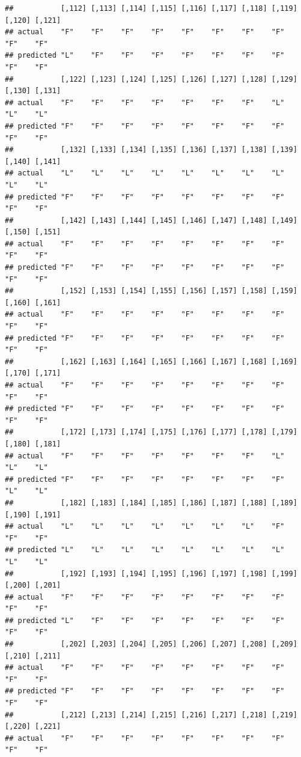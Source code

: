 \documentclass{article}\usepackage[]{graphicx}\usepackage[]{color}
\makeatletter
\newenvironment{kframe}{%
 \def\at@end@of@kframe{}%
 \ifinner\ifhmode%
  \def\at@end@of@kframe{\end{minipage}}%
  \begin{minipage}{\columnwidth}%
 \fi\fi%
 \def\FrameCommand##1{\hskip\@totalleftmargin \hskip-\fboxsep
 \colorbox{shadecolor}{##1}\hskip-\fboxsep
     \hskip-\linewidth \hskip-\@totalleftmargin \hskip\columnwidth}%
 \MakeFramed {\advance\hsize-\width
   \@totalleftmargin\z@ \linewidth\hsize
   \@setminipage}}%
 {\par\unskip\endMakeFramed%
 \at@end@of@kframe}
\newenvironment{knitrout}{}{} %
\makeatother
\begin{document}
\begin{knitrout}
\begin{kframe}
\begin{verbatim}
##           [,112] [,113] [,114] [,115] [,116] [,117] [,118] [,119] [,120] [,121]
## actual    "F"    "F"    "F"    "F"    "F"    "F"    "F"    "F"    "F"    "F"   
## predicted "L"    "F"    "F"    "F"    "F"    "F"    "F"    "F"    "F"    "F"   
##           [,122] [,123] [,124] [,125] [,126] [,127] [,128] [,129] [,130] [,131]
## actual    "F"    "F"    "F"    "F"    "F"    "F"    "F"    "L"    "L"    "L"   
## predicted "F"    "F"    "F"    "F"    "F"    "F"    "F"    "F"    "F"    "F"   
##           [,132] [,133] [,134] [,135] [,136] [,137] [,138] [,139] [,140] [,141]
## actual    "L"    "L"    "L"    "L"    "L"    "L"    "L"    "L"    "L"    "L"   
## predicted "F"    "F"    "F"    "F"    "F"    "F"    "F"    "F"    "F"    "F"   
##           [,142] [,143] [,144] [,145] [,146] [,147] [,148] [,149] [,150] [,151]
## actual    "F"    "F"    "F"    "F"    "F"    "F"    "F"    "F"    "F"    "F"   
## predicted "F"    "F"    "F"    "F"    "F"    "F"    "F"    "F"    "F"    "F"   
##           [,152] [,153] [,154] [,155] [,156] [,157] [,158] [,159] [,160] [,161]
## actual    "F"    "F"    "F"    "F"    "F"    "F"    "F"    "F"    "F"    "F"   
## predicted "F"    "F"    "F"    "F"    "F"    "F"    "F"    "F"    "F"    "F"   
##           [,162] [,163] [,164] [,165] [,166] [,167] [,168] [,169] [,170] [,171]
## actual    "F"    "F"    "F"    "F"    "F"    "F"    "F"    "F"    "F"    "F"   
## predicted "F"    "F"    "F"    "F"    "F"    "F"    "F"    "F"    "F"    "F"   
##           [,172] [,173] [,174] [,175] [,176] [,177] [,178] [,179] [,180] [,181]
## actual    "F"    "F"    "F"    "F"    "F"    "F"    "F"    "L"    "L"    "L"   
## predicted "F"    "F"    "F"    "F"    "F"    "F"    "F"    "F"    "L"    "L"   
##           [,182] [,183] [,184] [,185] [,186] [,187] [,188] [,189] [,190] [,191]
## actual    "L"    "L"    "L"    "L"    "L"    "L"    "L"    "F"    "F"    "F"   
## predicted "L"    "L"    "L"    "L"    "L"    "L"    "L"    "L"    "L"    "L"   
##           [,192] [,193] [,194] [,195] [,196] [,197] [,198] [,199] [,200] [,201]
## actual    "F"    "F"    "F"    "F"    "F"    "F"    "F"    "F"    "F"    "F"   
## predicted "L"    "F"    "F"    "F"    "F"    "F"    "F"    "F"    "F"    "F"   
##           [,202] [,203] [,204] [,205] [,206] [,207] [,208] [,209] [,210] [,211]
## actual    "F"    "F"    "F"    "F"    "F"    "F"    "F"    "F"    "F"    "F"   
## predicted "F"    "F"    "F"    "F"    "F"    "F"    "F"    "F"    "F"    "F"   
##           [,212] [,213] [,214] [,215] [,216] [,217] [,218] [,219] [,220] [,221]
## actual    "F"    "F"    "F"    "F"    "F"    "F"    "F"    "F"    "F"    "F"   

\end{verbatim}
\end{kframe}
\end{knitrout}
\end{document}
